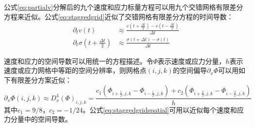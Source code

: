 公式\ref{eq:partialv}分解后的九个速度和应力标量方程可以用九个交错网格有限差分方程来近似。公式\ref{eq:staggedgrid}近似了交错网格有限差分方程的时间导数：
\begin{equation}
\begin{aligned}
  \partial_tv(t) &\approx \frac{v(t+\frac{\Delta t}{2})- v(t-\frac{\Delta t}{2})}{\Delta t} \\
\partial_{t} \sigma(t+\frac{\Delta t}{2}) &\approx \frac{\sigma(t+\Delta t) - \sigma(t)}{\Delta t}
\end{aligned}
  \label{eq:staggedgrid}
\end{equation}

速度和应力的空间导数可以用统一的方程描述。令$\Phi$表示速度或应力分量，$h$表示速度或应力网格中等距的空间分辨率，则网格点$(i,j,k)$的空间偏导$\partial_x \Phi$可以用如下有限差分方案近似：
\begin{equation}
  \partial_x \Phi(i,j,k) \approx D_x^4(\Phi)_{i,j,k} = \frac{c_1\left(\Phi_{i+\frac{1}{2},j,k} - \Phi_{i-\frac{1}{2},j,k}\right)+ c_2\left(\Phi_{i+\frac{3}{2},j,k} - \Phi_{i-\frac{3}{2},j,k}\right)}{h}
  \label{eq:staggedgridspatial}
\end{equation}
其中$c_1=9/8$，$c_2=-1/24$。公式\ref{eq:staggedgridspatial}可用以近似每个速度和应力分量中的空间导数。

